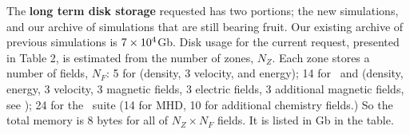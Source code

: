 The {\bf long term disk storage} requested has two portions; the new
simulations, and our archive of simulations that are still bearing fruit.
Our existing archive of previous simulations is $7\times {10^{4}}$Gb.
Disk usage for the current request, presented in Table 2, is estimated from the number of zones, $N_Z$.  Each zone
stores a number of fields, $N_F$: 5 for \nameTurbulence (density, 3 velocity, and
energy); 14 for \nameCores\ and
\nameCMB (density, energy, 3 velocity, 3 magnetic fields, 3 electric fields, 3
additional magnetic fields, see \citet{Collins10}); 24 for the \nameGalaxies\
suite (14 for MHD, 10 for additional chemistry fields.)  So the total memory is
8 bytes for all of $N_Z\times N_F$ fields.  It is listed in Gb in the table.

